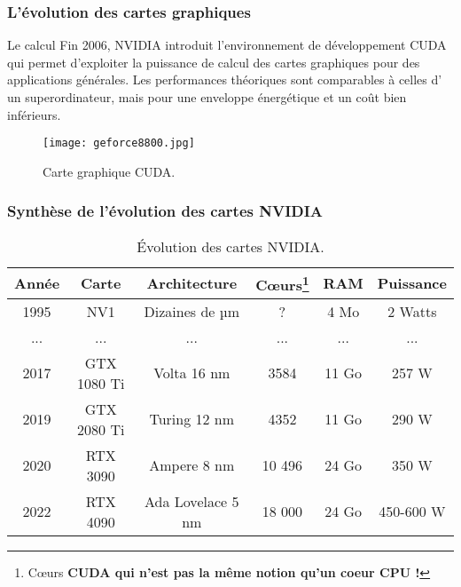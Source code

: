 \begin{frame}
  \frametitle{L'évolution des cartes graphiques}
\begin{block}{Le calcul}
    Fin 2006, NVIDIA introduit l'environnement de développement CUDA qui
    permet d'exploiter la puissance de calcul des cartes graphiques pour des applications générales.
    Les performances théoriques sont comparables à celles d' un 
    superordinateur, mais  pour une enveloppe énergétique et un coût bien inférieurs.

    \begin{figure}[htbp]
        \centering
       \texttt{[image: geforce8800.jpg]} 
        \caption{Carte graphique CUDA.}
        \label{fig:gforce8}
    \end{figure}
\end{block}
\end{frame}

\begin{frame}
  \frametitle{Synthèse de l'évolution des cartes NVIDIA}
\begin{table}
\footnotesize  \centering
            \begin{tabular}{cccccc}
            \rowcolor{lightgray}\textbf{Année} & \textbf{Carte} & \textbf{Architecture} & \textbf{Cœurs\footnote{\tiny Cœurs \bf{CUDA} qui n'est pas la même notion qu'un coeur CPU !}} & \textbf{RAM} & \textbf{Puissance} \\\hline
            1995 & NV1 & Dizaines de µm & ?  & 4 Mo & 2 Watts \\
            ... & ... & ...  & ... & ... & ...\\
    
            2017 & GTX 1080 Ti & Volta 16 nm & 3584 & 11 Go & 257 W \\
            2019 & GTX 2080 Ti & Turing 12 nm & 4352 & 11 Go & 290 W \\
            2020 & RTX 3090 & Ampere 8 nm & 10 496 & 24 Go & 350 W \\

            2022 & RTX 4090 & Ada Lovelace 5 nm & 18 000  & 24 Go & 450-600 W \\ 
            \end{tabular}
          \caption{Évolution des cartes NVIDIA.}\label{tab:evo_nvidia}
          \end{table}
\end{frame}
